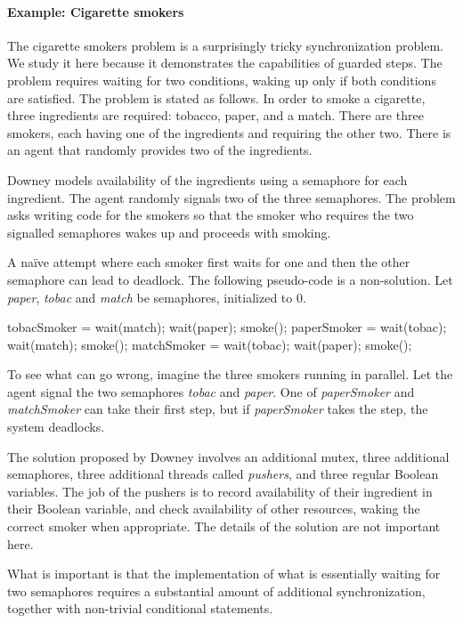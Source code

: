 \paragraph{Example: Cigarette smokers}

The cigarette smokers problem \cite{books/Downey08LBOS} is a surprisingly tricky synchronization problem.
We study it here because it demonstrates the capabilities of guarded steps.
The problem requires waiting for two conditions, waking up only if both conditions are satisfied.
The problem is stated as follows.
In order to smoke a cigarette, three ingredients are required: tobacco, paper, and a match.
There are three smokers, each having one of the ingredients and requiring the other two.
There is an agent that randomly provides two of the ingredients.

Downey models availability of the ingredients using a semaphore for each ingredient.
The agent randomly signals two of the three semaphores.
The problem asks writing code for the smokers so that the smoker who requires the two signalled semaphores wakes up and proceeds with smoking.

A na\"ive attempt where each smoker first waits for one and then the other semaphore can lead to deadlock.
The following pseudo-code is a non-solution.
Let \emph{paper}, \emph{tobac} and \emph{match} be semaphores, initialized to 0.
\begin{TASK}
  tobacSmoker = wait(match); wait(paper); smoke();
  paperSmoker = wait(tobac); wait(match); smoke();
  matchSmoker = wait(tobac); wait(paper); smoke();
\end{TASK}
To see what can go wrong, imagine the three smokers running in parallel.
Let the agent signal the two semaphores \emph{tobac} and \emph{paper}.
One of \emph{paperSmoker} and \emph{matchSmoker} can take their first step, but if \emph{paperSmoker} takes the step, the system deadlocks.

The solution proposed by Downey involves an additional mutex, three additional semaphores, three additional threads called \emph{pushers}, and three regular Boolean variables.
The job of the pushers is to record availability of their ingredient in their Boolean variable, and check availability of other resources, waking the correct smoker when appropriate.
The details of the solution are not important here.

What is important is that the implementation of what is essentially waiting for two semaphores requires a substantial amount of additional synchronization, together with non-trivial conditional statements.

